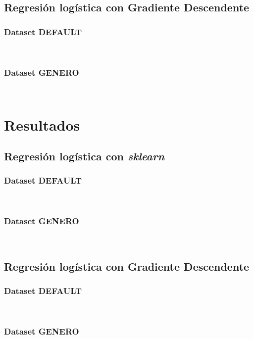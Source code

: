 \documentclass[sigconf,authorversion,nonacm]{acmart}
\begin{document}
\subsection{Regresión logística con Gradiente Descendente}

\subsubsection{Dataset DEFAULT}\hfill\\

\subsubsection{Dataset GENERO}\hfill\\


\section{Resultados}

\subsection{Regresión logística con \textit{sklearn}}

\subsubsection{Dataset DEFAULT}\hfill\\

\subsubsection{Dataset GENERO}\hfill\\

\subsection{Regresión logística con Gradiente Descendente}

\subsubsection{Dataset DEFAULT}\hfill\\

\subsubsection{Dataset GENERO}\hfill\\
\end{document}
